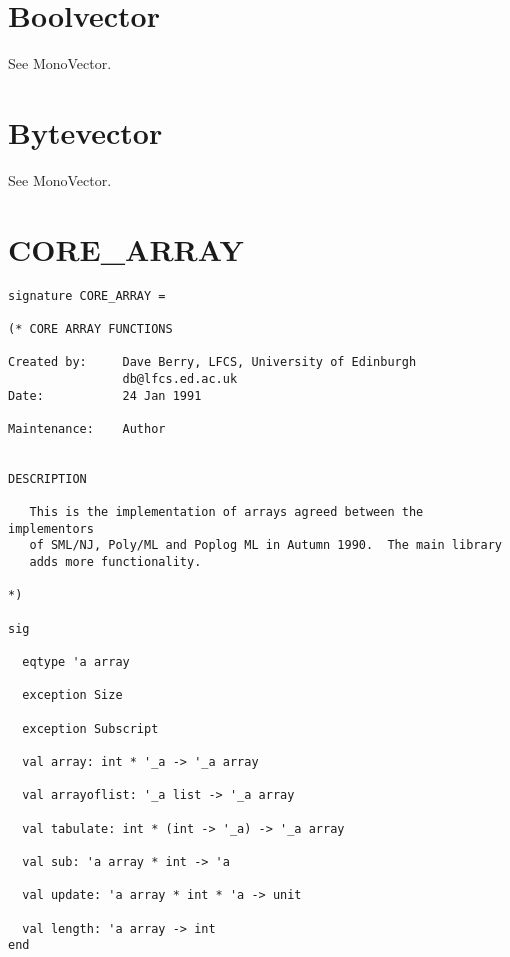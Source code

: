 \section{Boolvector}
See MonoVector.

\section{Bytevector}
See MonoVector.

\newpage
\section{CORE\_ARRAY}
\begin{verbatim}
signature CORE_ARRAY =

(* CORE ARRAY FUNCTIONS

Created by:     Dave Berry, LFCS, University of Edinburgh
                db@lfcs.ed.ac.uk
Date:           24 Jan 1991

Maintenance:    Author


DESCRIPTION

   This is the implementation of arrays agreed between the implementors
   of SML/NJ, Poly/ML and Poplog ML in Autumn 1990.  The main library
   adds more functionality.

*)

sig

  eqtype 'a array

  exception Size

  exception Subscript

  val array: int * '_a -> '_a array

  val arrayoflist: '_a list -> '_a array

  val tabulate: int * (int -> '_a) -> '_a array

  val sub: 'a array * int -> 'a

  val update: 'a array * int * 'a -> unit

  val length: 'a array -> int
end
\end{verbatim}

\newpage
